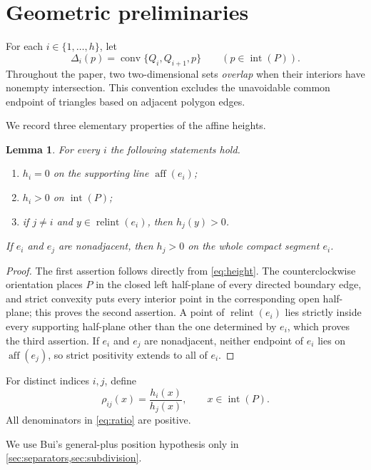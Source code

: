 \documentclass[final,5p,times,twocolumn]{elsarticle}
\newtheorem{lemma}[lemma]{Lemma}
\theoremstyle{definition}
\theoremstyle{remark}
\newcommand{\interior}[1]{\operatorname{int}(#1)}
\newcommand{\relint}{\operatorname{relint}}
\newcommand{\conv}{\operatorname{conv}}
\newcommand{\aff}{\operatorname{aff}}
\newcommand{\height}{h}
\newcommand{\ratio}{\rho}
\begin{document}
\section{Geometric preliminaries}
\label{sec:prelim}

For each $i\in\{1,\ldots,h\}$, let
\[
\Delta_i(p)=\conv\{Q_i,Q_{i+1},p\}
\qquad (p\in\interior P).
\]
Throughout the paper, two two-dimensional sets \emph{overlap} when their interiors have nonempty intersection. This convention excludes the unavoidable common endpoint of triangles based on adjacent polygon edges.

We record three elementary properties of the affine heights.

\begin{lemma}
\label{lem:height-properties}
For every $i$ the following statements hold.
\begin{enumerate}[label=\textup{(\roman*)}]
\item $\height_i=0$ on the supporting line $\aff(e_i)$;
\item $\height_i>0$ on $\interior P$;
\item if $j\neq i$ and $y\in\relint(e_i)$, then $\height_j(y)>0$.
\end{enumerate}
If $e_i$ and $e_j$ are nonadjacent, then $\height_j>0$ on the whole compact segment $e_i$.
\end{lemma}

\begin{proof}
The first assertion follows directly from \eqref{eq:height}. The counterclockwise orientation places $P$ in the closed left half-plane of every directed boundary edge, and strict convexity puts every interior point in the corresponding open half-plane; this proves the second assertion. A point of $\relint(e_i)$ lies strictly inside every supporting half-plane other than the one determined by $e_i$, which proves the third assertion. If $e_i$ and $e_j$ are nonadjacent, neither endpoint of $e_i$ lies on $\aff(e_j)$, so strict positivity extends to all of $e_i$.
\end{proof}

For distinct indices $i,j$, define
\begin{equation}
\ratio_{ij}(x)=\frac{\height_i(x)}{\height_j(x)},
\qquad x\in\interior P.
\label{eq:ratio}
\end{equation}
All denominators in \eqref{eq:ratio} are positive.

We use Bui's general-plus position hypothesis only in \cref{sec:separators,sec:subdivision}.
\end{document}
